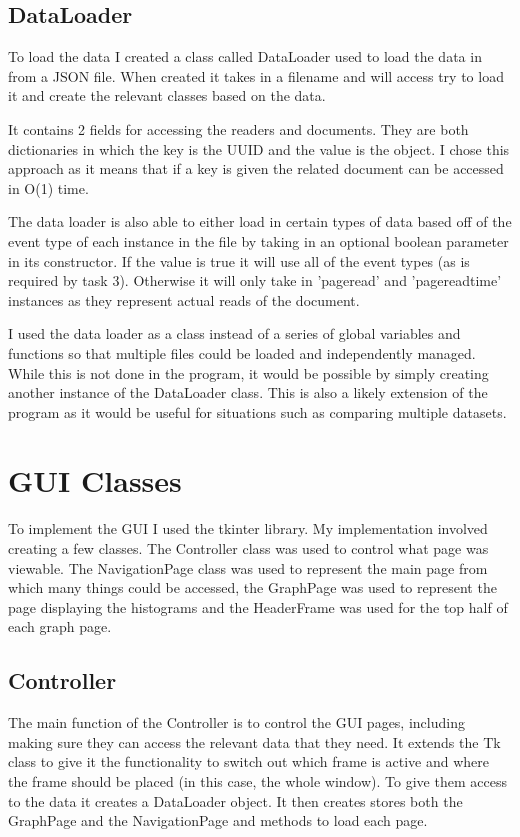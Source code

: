 \documentclass[12pt]{report}
\begin{document}
\subsection{DataLoader}
To load the data I created a class called DataLoader used to load the data in from a JSON file.  When created it takes in a filename and will access try to load it and create the relevant classes based on the data.  

It contains 2 fields for accessing the readers and documents.  They are both dictionaries in which the key is the UUID and the value is the object.  I chose this approach as it means that if a key is given the related document can be accessed in O(1) time.

The data loader is also able to either load in certain types of data based off of the event type of each instance in the file by taking in an optional boolean parameter in its constructor.  If the value is true it will use all of the event types (as is required by task 3).  Otherwise it will only take in 'pageread' and 'pagereadtime' instances as they represent actual reads of the document.

I used the data loader as a class instead of a series of global variables and functions so that multiple files could be loaded and independently managed.  While this is not done in the program, it would be possible by simply creating another instance of the DataLoader class.  This is also a likely extension of the program as it would be useful for situations such as comparing multiple datasets.

\section{GUI Classes}
To implement the GUI I used the tkinter library.  My implementation involved creating a few classes.  The Controller class was used to control what page was viewable.  The NavigationPage class was used to represent the main page from which many things could be accessed, the GraphPage was used to represent the page displaying the histograms and the HeaderFrame was used for the top half of each graph page.

\subsection{Controller}
The main function of the Controller is to control the GUI pages, including making sure they can access the relevant data that they need.  It extends the Tk class to give it the functionality to switch out which frame is active and where the frame should be placed (in this case, the whole window).  To give them access to the data it creates a DataLoader object.  It then creates stores both the GraphPage and the NavigationPage and methods to load each page.  
\end{document}

